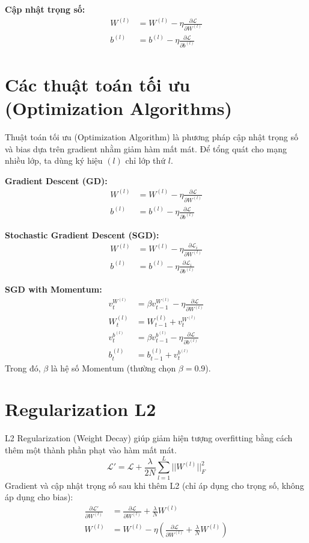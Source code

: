 \documentclass[12pt,a4paper]{report}
\begin{document}
\textbf{Cập nhật trọng số:}
\begin{align}
    W^{(l)} &= W^{(l)} - \eta \frac{\partial \mathcal{L}}{\partial W^{(l)}} \\
    b^{(l)} &= b^{(l)} - \eta \frac{\partial \mathcal{L}}{\partial b^{(l)}}
\end{align}

\section{Các thuật toán tối ưu (Optimization Algorithms)}
Thuật toán tối ưu (Optimization Algorithm) là phương pháp cập nhật trọng số và bias dựa trên gradient nhằm giảm hàm mất mát. Để tổng quát cho mạng nhiều lớp, ta dùng ký hiệu $(l)$ chỉ lớp thứ $l$.

\textbf{Gradient Descent (GD):}
\begin{align}
    W^{(l)} &= W^{(l)} - \eta \frac{\partial \mathcal{L}}{\partial W^{(l)}} \\
    b^{(l)} &= b^{(l)} - \eta \frac{\partial \mathcal{L}}{\partial b^{(l)}}
\end{align}

\textbf{Stochastic Gradient Descent (SGD):}
\begin{align}
    W^{(l)} &= W^{(l)} - \eta \frac{\partial \mathcal{L}_i}{\partial W^{(l)}} \\
    b^{(l)} &= b^{(l)} - \eta \frac{\partial \mathcal{L}_i}{\partial b^{(l)}}
\end{align}

\textbf{SGD with Momentum:}
\begin{align}
    v_t^{W^{(l)}} &= \beta v_{t-1}^{W^{(l)}} - \eta \frac{\partial \mathcal{L}}{\partial W^{(l)}} \\
    W_t^{(l)} &= W_{t-1}^{(l)} + v_t^{W^{(l)}} \\
    v_t^{b^{(l)}} &= \beta v_{t-1}^{b^{(l)}} - \eta \frac{\partial \mathcal{L}}{\partial b^{(l)}} \\
    b_t^{(l)} &= b_{t-1}^{(l)} + v_t^{b^{(l)}}
\end{align}
Trong đó, $\beta$ là hệ số Momentum (thường chọn $\beta = 0.9$).

\section{Regularization L2}
L2 Regularization (Weight Decay) giúp giảm hiện tượng overfitting bằng cách thêm một thành phần phạt vào hàm mất mát.
\begin{equation}
    \mathcal{L}' = \mathcal{L} + \frac{\lambda}{2N} \sum_{l=1}^L ||W^{(l)}||_F^2
\end{equation}
Gradient và cập nhật trọng số sau khi thêm L2 (chỉ áp dụng cho trọng số, không áp dụng cho bias):
\begin{align}
    \frac{\partial \mathcal{L}'}{\partial W^{(l)}} &= \frac{\partial \mathcal{L}}{\partial W^{(l)}} + \frac{\lambda}{N} W^{(l)} \\
    W^{(l)} &= W^{(l)} - \eta \left( \frac{\partial \mathcal{L}}{\partial W^{(l)}} + \frac{\lambda}{N} W^{(l)} \right)
\end{align}
\end{document}

